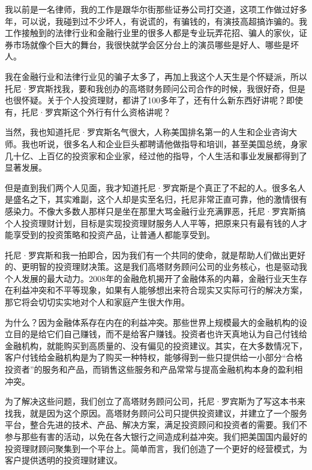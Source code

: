 

我以前是一名律师，我的工作是跟华尔街那些证券公司打交道，这项工作做过好多年，可以说，我碰到过不少坏人，有说谎的，有骗钱的，有演技高超搞诈骗的。我工作接触到的法律行业和金融行业里的很多人都是专业玩弄花招、骗人的家伙，证券市场就像个巨大的舞台，我很快就学会区分台上的演员哪些是好人、哪些是坏人。

我在金融行业和法律行业见的骗子太多了，再加上我这个人天生是个怀疑派，所以托尼·罗宾斯找我，要和我创办的高塔财务顾问公司合作的时候，我很好奇，但是也很怀疑。关于个人投资理财，都讲了100多年了，还有什么新东西好讲呢？即使有，托尼·罗宾斯这个外行有什么资格讲呢？

当然，我也知道托尼·罗宾斯名气很大，人称美国排名第一的人生和企业咨询大师。我也听说，很多名人和企业巨头都聘请他做指导和培训，甚至美国总统，身家几十亿、上百亿的投资家和企业家，经过他的指导，个人生活和事业发展都得到了显著发展。

但是直到我们两个人见面，我才知道托尼·罗宾斯是个真正了不起的人。很多名人是盛名之下，其实难副，这个人却是实至名归，托尼非常正直可靠，他的激情很有感染力。不像大多数人那样只是坐在那里大骂金融行业充满罪恶，托尼·罗宾斯搞个人投资理财计划，目标是实现投资理财服务人人平等，把原来只有最有钱的人才能享受到的投资策略和投资产品，让普通人都能享受到。

托尼·罗宾斯和我一拍即合，因为我们有一个共同的使命，就是帮助人们做出更好的、更明智的投资理财决策。这是我们高塔财务顾问公司的业务核心，也是驱动我个人发展的最大动力。2008年的金融危机揭开了金融体系的内幕，金融行业天生存在利益冲突和不平等现象，如果有人能够想出来符合现实又实际可行的解决方案，那它将会切切实实地对个人和家庭产生很大作用。

为什么？因为金融体系存在内在的利益冲突。那些世界上规模最大的金融机构的设立目的是给它们自己赚钱，而不是给客户赚钱。投资者也许天真地认为自己付钱给金融机构，就能购买到高质量的、没有偏见的投资建议。其实，在大多数情况下，客户付钱给金融机构是为了购买一种特权，能够得到一些只提供给一小部分“合格投资者”的服务和产品，而销售这些服务和产品常常与提高金融机构本身的盈利相冲突。

为了解决这些问题，我们创立了高塔财务顾问公司，托尼·罗宾斯为了写这本书来找我，就是因为这个原因。高塔财务顾问公司只提供投资建议，并建立了一个服务平台，整合先进的技术、产品、解决方案，满足投资顾问和投资者的需要。我们不参与那些有害的活动，以免在各大银行之间造成利益冲突。我们把美国国内最好的投资理财顾问聚集到一个平台上。简单而言，我们创造了一个更好的经营模式，为客户提供透明的投资理财建议。

